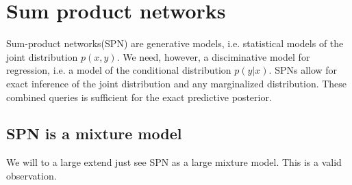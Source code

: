





\section{Sum product networks}
Sum-product networks(SPN) are generative models, i.e. statistical models of the joint distribution $p(x,y)$. 
We need, however, a disciminative model for regression, i.e. 
a model of the conditional distribution $p(y|x)$. 
SPNs allow for exact inference of the joint distribution 
and any marginalized distribution. These combined queries is sufficient for the
exact predictive posterior. 


\subsection{SPN is a mixture model}
We will to a large extend just see SPN as a large mixture model. This is a valid observation. 

